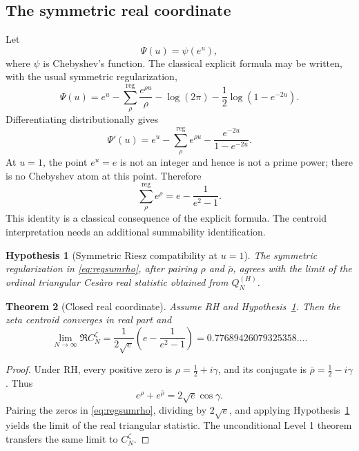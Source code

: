 \documentclass[11pt]{amsart}
\numberwithin{equation}{section}
\newtheorem{theorem}{Theorem}[section]
\newtheorem{hypothesis}[theorem]{Hypothesis}
\theoremstyle{definition}
\theoremstyle{remark}
\begin{document}
\subsection{The symmetric real coordinate}\label{subsec:symmetric_real}
Let
\[
\Psi(u)=\psi(e^u),
\]
where $\psi$ is Chebyshev's function.  The classical explicit formula may be written, with the usual symmetric regularization,
\begin{equation}\label{eq:explicitPsi}
\Psi(u)=e^u-
\sum_{\rho}^{\mathrm{reg}}\frac{e^{\rho u}}{\rho}
-\log(2\pi)-\frac12\log(1-e^{-2u}).
\end{equation}
Differentiating distributionally gives
\begin{equation}\label{eq:explicitDerivative}
\Psi'(u)=e^u-
\sum_{\rho}^{\mathrm{reg}}e^{\rho u}
-\frac{e^{-2u}}{1-e^{-2u}}.
\end{equation}
At $u=1$, the point $e^u=e$ is not an integer and hence is not a prime power; there is no Chebyshev atom at this point.  Therefore
\begin{equation}\label{eq:regsumrho}
\boxed{
\sum_{\rho}^{\mathrm{reg}}e^{\rho}
=e-\frac1{e^2-1}.
}
\end{equation}
This identity is a classical consequence of the explicit formula.  The centroid interpretation needs an additional summability identification.

\begin{hypothesis}[Symmetric Riesz compatibility at $u=1$]\label{hyp:SR}
The symmetric regularization in \eqref{eq:regsumrho}, after pairing $\rho$ and $\bar\rho$, agrees with the limit of the ordinal triangular Cesàro real statistic obtained from $Q_N^{(H)}$.
\end{hypothesis}

\begin{theorem}[Closed real coordinate]\label{thm:realconstant}
Assume RH and Hypothesis~\ref{hyp:SR}.  Then the zeta centroid converges in real part and
\begin{equation}\label{eq:realclosed}
\boxed{
\lim_{N\to\infty}\Re C_N^{\zeta}
=\frac{1}{2\sqrt e}\left(e-\frac1{e^2-1}\right)
=0.77689426079325358\ldots.
}
\end{equation}
\end{theorem}
\begin{proof}
Under RH, every positive zero is $\rho=\tfrac12+i\gamma$, and its conjugate is $\bar\rho=\tfrac12-i\gamma$.  Thus
\[
e^{\rho}+e^{\bar\rho}=2\sqrt e\cos\gamma.
\]
Pairing the zeros in \eqref{eq:regsumrho}, dividing by $2\sqrt e$, and applying Hypothesis~\ref{hyp:SR} yields the limit of the real triangular statistic.  The unconditional Level 1 theorem transfers the same limit to $C_N^{\zeta}$.
\end{proof}
\end{document}
